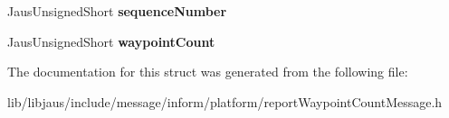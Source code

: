 \begin{DoxyCompactItemize}
\item 
\hypertarget{struct_report_waypoint_count_message_struct_ad3ff779cb2741a9b953bae527b2b698a}{\-Jaus\-Unsigned\-Short {\bfseries sequence\-Number}}\label{struct_report_waypoint_count_message_struct_ad3ff779cb2741a9b953bae527b2b698a}

\item 
\hypertarget{struct_report_waypoint_count_message_struct_abf0b9fffd9fec69f03f56ce79783bf8c}{\-Jaus\-Unsigned\-Short {\bfseries waypoint\-Count}}\label{struct_report_waypoint_count_message_struct_abf0b9fffd9fec69f03f56ce79783bf8c}

\end{DoxyCompactItemize}


\-The documentation for this struct was generated from the following file\-:\begin{DoxyCompactItemize}
\item 
lib/libjaus/include/message/inform/platform/report\-Waypoint\-Count\-Message.\-h\end{DoxyCompactItemize}
